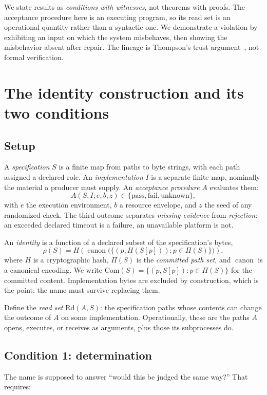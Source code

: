 \documentclass[10pt,twocolumn,letterpaper]{article}
\begin{document}
We state results as \emph{conditions with witnesses}, not theorems with proofs. The acceptance procedure here is an executing program, so its read set is an operational quantity rather than a syntactic one. We demonstrate a violation by exhibiting an input on which the system misbehaves, then showing the misbehavior absent after repair. The lineage is Thompson's trust argument~\cite{thompson}, not formal verification.

\section{The identity construction and its two conditions}
\label{sec:identity}
\subsection{Setup}
A \emph{specification} $S$ is a finite map from paths to byte strings, with each path assigned a declared role. An \emph{implementation} $I$ is a separate finite map, nominally the material a producer must supply. An \emph{acceptance procedure} $A$ evaluates them:
\begin{equation}
A(S,I;e,b,z)\in\{\mathrm{pass},\mathrm{fail},\mathrm{unknown}\},
\end{equation}
with $e$ the execution environment, $b$ a resource envelope, and $z$ the seed of any randomized check. The third outcome separates \emph{missing evidence} from \emph{rejection}: an exceeded declared timeout is a failure, an unavailable platform is not.

An \emph{identity} is a function of a declared subset of the specification's bytes,
\begin{equation}
\rho(S)=H\!\left(\operatorname{canon}\big(\{(p,H(S[p])):p\in\Pi(S)\}\big)\right),
\end{equation}
where $H$ is a cryptographic hash, $\Pi(S)$ is the \emph{committed path set}, and $\operatorname{canon}$ is a canonical encoding. We write $\mathrm{Com}(S)=\{(p,S[p]):p\in\Pi(S)\}$ for the committed content. Implementation bytes are excluded by construction, which is the point: the name must survive replacing them.

Define the \emph{read set} $\mathrm{Rd}(A,S)$: the specification paths whose contents can change the outcome of $A$ on some implementation. Operationally, these are the paths $A$ opens, executes, or receives as arguments, plus those its subprocesses do.

\subsection{Condition 1: determination}
The name is supposed to answer ``would this be judged the same way?'' That requires:
\end{document}
